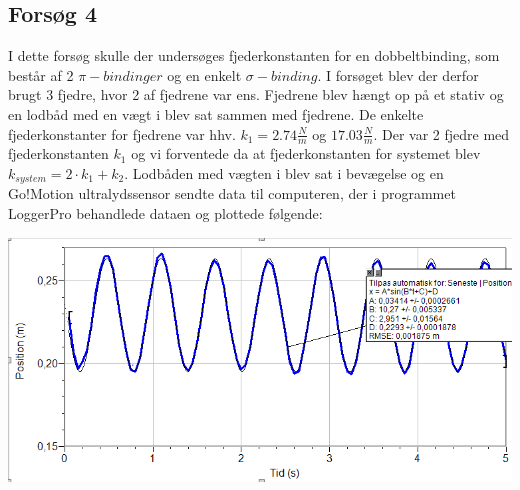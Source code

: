 \subsection{Forsøg 4}
I dette forsøg skulle der undersøges fjederkonstanten for en dobbeltbinding, som består af 2 $\pi-bindinger$ og en enkelt $\sigma-binding$. I forsøget blev der derfor brugt 3 fjedre, hvor 2 af fjedrene var ens. Fjedrene blev hængt op på et stativ og en lodbåd med en vægt i blev sat sammen med fjedrene. De enkelte fjederkonstanter for fjedrene var hhv. $k_1 = 2.74 \frac{N}{m} $ og $17.03 \frac{N}{m}$. Der var 2 fjedre med fjederkonstanten $k_1$ og vi forventede da at fjederkonstanten for systemet blev $k_{system}= 2 \cdot k_1 + k_2$. Lodbåden med vægten i blev sat i bevægelse og en Go!Motion ultralydssensor sendte data til computeren, der i programmet LoggerPro behandlede dataen og plottede følgende:

\begin{center}
\includegraphics[scale=0.7]{Billeder/graf4}
\end{center}